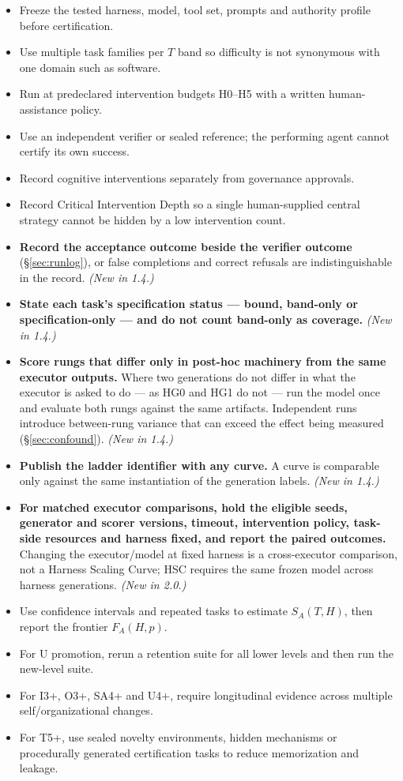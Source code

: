 \documentclass[11pt]{article}
\theoremstyle{definition}
\newcommand{\SA}{\ensuremath{S_A(T,H)}}
\newcommand{\FA}{\ensuremath{F_A(H,p)}}
\begin{document}
\begin{itemize}
\item Freeze the tested harness, model, tool set, prompts and authority profile before certification.
\item Use multiple task families per $T$ band so difficulty is not synonymous with one domain such as software.
\item Run at predeclared intervention budgets H0--H5 with a written human-assistance policy.
\item Use an independent verifier or sealed reference; the performing agent cannot certify its own success.
\item Record cognitive interventions separately from governance approvals.
\item Record Critical Intervention Depth so a single human-supplied central strategy cannot be hidden by a low intervention count.
\item \textbf{Record the acceptance outcome beside the verifier outcome} (\S\ref{sec:runlog}), or false completions and correct refusals are indistinguishable in the record. \emph{(New in 1.4.)}
\item \textbf{State each task's specification status --- bound, band-only or specification-only --- and do not count band-only as coverage.} \emph{(New in 1.4.)}
\item \textbf{Score rungs that differ only in post-hoc machinery from the same executor outputs.} Where two generations do not differ in what the executor is asked to do --- as HG0 and HG1 do not --- run the model once and evaluate both rungs against the same artifacts. Independent runs introduce between-rung variance that can exceed the effect being measured (\S\ref{sec:confound}). \emph{(New in 1.4.)}
\item \textbf{Publish the ladder identifier with any curve.} A curve is comparable only against the same instantiation of the generation labels. \emph{(New in 1.4.)}
\item \textbf{For matched executor comparisons, hold the eligible seeds, generator and scorer versions, timeout, intervention policy, task-side resources and harness fixed, and report the paired outcomes.} Changing the executor/model at fixed harness is a cross-executor comparison, not a Harness Scaling Curve; HSC requires the same frozen model across harness generations. \emph{(New in 2.0.)}
\item Use confidence intervals and repeated tasks to estimate \SA{}, then report the frontier \FA{}.
\item For U promotion, rerun a retention suite for all lower levels and then run the new-level suite.
\item For I3+, O3+, SA4+ and U4+, require longitudinal evidence across multiple self/organizational changes.
\item For T5+, use sealed novelty environments, hidden mechanisms or procedurally generated certification tasks to reduce memorization and leakage.
\end{itemize}
\end{document}
